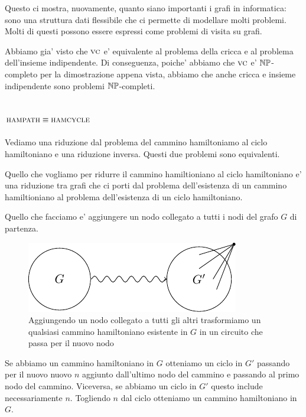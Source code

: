 Questo ci mostra, nuovamente, quanto siano importanti i grafi in informatica: sono una struttura
dati flessibile che ci permette di modellare molti problemi. Molti di questi possono essere espressi
come problemi di visita su grafi.

Abbiamo gia' visto che $\textsc{vc}$ e' equivalente al problema della cricca e al problema dell'insieme
indipendente. Di conseguenza, poiche' abbiamo che $\textsc{vc}$ e' $\mathbb{NP}$-completo per la dimostrazione
appena vista, abbiamo che anche cricca e insieme indipendente sono problemi $\mathbb{NP}$-completi.

\subsection{$\textsc{hampath} \equiv \textsc{hamcycle}$}

Vediamo una riduzione dal problema del cammino hamiltoniamo al ciclo hamiltoniano e una riduzione
inversa. Questi due problemi sono equivalenti.

Quello che vogliamo per ridurre il cammino hamiltioniano al ciclo hamiltoniano e' una riduzione tra
grafi che ci porti dal problema dell'esistenza di un cammino hamiltioniano al problema
dell'esistenza di un ciclo hamiltoniano.

Quello che facciamo e' aggiungere un nodo collegato a tutti i nodi del grafo $G$ di partenza.

\begin{figure}[h]
    \begin{center}
        \includegraphics{./img/NPClass/HAMPATHCYCLE.pdf}
        \caption{Aggiungendo un nodo collegato a tutti gli altri trasformiamo un qualsiasi cammino
        hamiltoniano esistente in $G$ in un circuito che passa per il nuovo nodo}
    \end{center}
\end{figure}

Se abbiamo un cammino hamiltoniano in $G$ otteniamo un ciclo in $G'$ passando per il nuovo nuovo $n$
aggiunto dall'ultimo nodo del cammino e passando al primo nodo del cammino. Viceversa, se abbiamo un
ciclo in $G'$ questo include necessariamente $n$. Togliendo $n$ dal ciclo otteniamo un cammino
hamiltoniano in $G$.

